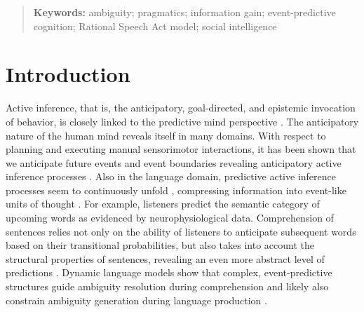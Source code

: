 \documentclass[10pt,a4paper]{article}
\begin{document}
\begin{abstract}

\textbf{Keywords:} 
ambiguity; pragmatics; information gain; event-predictive cognition; Rational Speech Act model; social intelligence
\end{abstract}



\section{Introduction}

Active inference, that is, the anticipatory, goal-directed, and epistemic invocation of behavior, is
closely linked to the predictive mind perspective \cite{Friston:2015,Hohwy:2013,Clark:2016}. 
The anticipatory nature of the human mind reveals itself in many domains.
With respect to planning and executing manual sensorimotor interactions, 
it has been shown that we anticipate future events and event boundaries revealing anticipatory active inference processes \cite{belardinelli2016s, belardinelli2018mental,Friston:2015,Hayhoe:2003,lohmann2019hands}.
Also in the language domain, predictive active inference processes seem to continuously unfold \cite{Christiansen:2016}, compressing information into event-like units of thought \cite{Gaerdenfors:2014}.
For example, listeners predict the semantic category of upcoming words \cite{federmeier2002picture} as evidenced by neurophysiological data.
Comprehension of sentences relies not only on the ability of listeners to anticipate subsequent words based on their transitional probabilities, but also takes into account the structural properties of sentences, revealing an even more abstract level of predictions \cite{levy2008expectation}.
Dynamic language models show that complex, event-predictive structures guide ambiguity resolution during comprehension and likely also constrain ambiguity generation during language production \cite{Elman:2019}. 
\end{document}
